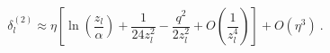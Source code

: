 \begin{equation}
\label{delta2}
\delta_l^{(2)}\approx\eta\left[\ln\left(\frac{z_l}\alpha\right)+\frac1{24z_l^2}
-\frac{q^2}{2z_l^2}+O\left(\frac1{z_l^4}\right)\right]+O(\eta^3) \ .
\end{equation}

